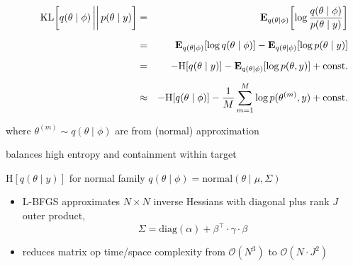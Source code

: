 \documentclass[9pt]{report}
\begin{document}
\vspace*{-4pt}
  \begin{eqnarray*}
\null \qquad \textrm{KL}\!\left[q(\theta \mid \phi) \,\bigg|\bigg|\, p(\theta \mid y)\right]
  & = &
  \mathbb{E}_{q(\theta \mid \phi)}
        \!\left[ \log \frac{q(\theta \mid \phi)}{p(\theta \mid y)} \right]
  \\[6pt]
  & = &   \mathbb{E}_{q(\theta \mid \phi)}[\log q(\theta \mid \phi)]
        - \mathbb{E}_{q(\theta \mid \phi)}[\log p(\theta \mid y)]
 \\[6pt]
 & = &   - \textrm{H}\!\left[q(\theta \mid y)\right] - \mathbb{E}_{q(\theta \mid \phi)}[\log p(\theta, y)] + \textrm{const.}
  \\[6pt]
  & \approx & -\textrm{H}\!\left[q(\theta \mid \phi)\right] - \frac{1}{M} \sum_{m=1}^M \log p(\theta^{(m)}, y) + \textrm{const.}
  \end{eqnarray*}
  \vspace*{-6pt}
\begin{subitemize}
\item where $\theta^{(m)} \sim q(\theta \mid \phi)$ are  from (normal) approximation
  \item {} balances high entropy and containment within target
\item {} $\textrm{H}\!\left[q(\theta \mid y)\right]$ for normal family $q(\theta \mid \phi) = \textrm{normal}(\theta \mid \mu, \Sigma)$
\end{subitemize}

\begin{itemize}
\item L-BFGS approximates $N \times N$ inverse Hessians with diagonal plus rank $J$ outer product,
  \[
    \Sigma = \textrm{diag}(\alpha) + \beta^{\top} \cdot \gamma \cdot \beta
  \]
\item reduces matrix op time/space complexity from $\mathcal{O}(N^3)$ to $\mathcal{O}(N \cdot J^2)$
\end{itemize}
\end{document}

